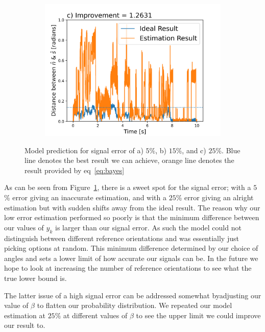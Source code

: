 \documentclass[final, 3p]{elsarticle}
\begin{document}
\begin{figure}[h]
\begin{subfigure}{0.32\textwidth}
		\includegraphics[width=\textwidth]{./Images/epsilon_at_25.png}
	\end{subfigure}
	\caption{Model prediction for signal error of a) $5\%$, b) $15\%$, and c) $25\%$. Blue line denotes the best result we can achieve, orange line denotes the result provided by eq~\ref{eq:bayes}}
	\label{fig:epsilon}
\end{figure}


As can be seen from Figure~\ref{fig:epsilon}, there is a
sweet spot for the signal error; with a $5$\% error giving an
inaccurate estimation, and with a $25$\% error giving an alright
estimation but with sudden shifts away from the ideal result. The
reason why our low error estimation performed so poorly is that the
minimum difference between our values of $y_k$ is larger than our
signal error. As such the model could not distinguish between
different reference orientations and was essentially just picking
options at random. This minimum difference determined by our choice of
angles and sets a lower limit of how accurate our signals can be. In
the future we hope to look at increasing the number of reference
orientations to see what the true lower bound is.

The latter issue of a high signal error can be addressed somewhat byadjusting our value of $\beta$ to flatten our probability distribution. We repeated our model estimation at $25\%$ at different values of $\beta$ to see the upper limit we could improve our result to.
\end{document}
